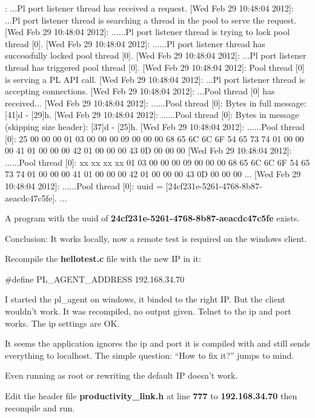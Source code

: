 \begin{codelisting}
: ...Pl port listener thread has received a request.
[Wed Feb 29 10:48:04 2012]: ...Pl port listener thread is searching a thread in the pool to serve the request.
[Wed Feb 29 10:48:04 2012]: ......Pl port listener thread is trying to lock pool thread [0].
[Wed Feb 29 10:48:04 2012]: ......Pl port listener thread has successfully locked pool thread [0].
[Wed Feb 29 10:48:04 2012]: ...Pl port listener thread has triggered pool thread [0].
[Wed Feb 29 10:48:04 2012]: Pool thread [0] is serving a PL API call.
[Wed Feb 29 10:48:04 2012]: ...Pl port listener thread is accepting connections.
[Wed Feb 29 10:48:04 2012]: ...Pool thread [0] has received...
[Wed Feb 29 10:48:04 2012]: ......Pool thread [0]: Bytes in full message: [41]d - [29]h.
[Wed Feb 29 10:48:04 2012]: ......Pool thread [0]: Bytes in message (skipping size header): [37]d - [25]h.
[Wed Feb 29 10:48:04 2012]: ......Pool thread [0]: 25 00 00 00 01 03 00 00 00 09 00 00 00 68 65 6C 6C 6F 54 65 73 74 01 00 00 00 41 01 00 00 00 42 01 00 00 00 43 0D 00 00 00 
[Wed Feb 29 10:48:04 2012]: ......Pool thread [0]: xx xx xx xx 01 03 00 00 00 09 00 00 00 68 65 6C 6C 6F 54 65 73 74 01 00 00 00 41 01 00 00 00 42 01 00 00 00 43 0D 00 00 00 
...
[Wed Feb 29 10:48:04 2012]: ......Pool thread [0]: uuid = [24cf231e-5261-4768-8b87-aeacdc47c5fe].
...
\end{codelisting}
A program with the \gls{uuid} of \textbf{24cf231e-5261-4768-8b87-aeacdc47c5fe} exists.

Conclusion: It works locally, now a remote test is required on the windows client.

Recompile the \textbf{hellotest.c} file with the new IP in it: 
\begin{codelisting}
#define PL_AGENT_ADDRESS 192.168.34.70
\end{codelisting}
I started the pl\_agent on windows, it binded to the right IP. But the client wouldn't work. It was recompiled, no output given. Telnet to the ip and port works. The ip settings are OK.

It seems the application ignores the ip and port it is compiled with and still sends everything to localhost. The simple question: ``How to fix it?'' jumps to mind.

Even running as root or rewriting the default IP doesn't work.

Edit the header file  \textbf{productivity\_link.h} at line \textbf{777} to \textbf{192.168.34.70} then recompile and run.

